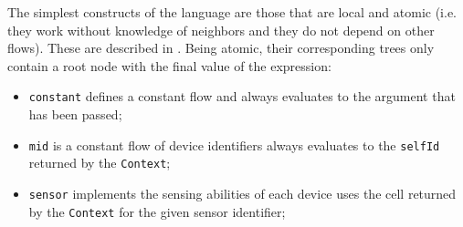 The simplest constructs of the language are those that are local and atomic (i.e. they work without knowledge of neighbors and they do not depend on other flows).
%
These are described in .
%
Being atomic, their corresponding trees only contain a root node with the final value of the expression:
\begin{itemize}
    \item \texttt{constant} defines a constant flow and always evaluates to the argument that has been passed;
    \item \texttt{mid} is a constant flow of device identifiers always evaluates to the \texttt{selfId} returned by the \texttt{Context};
    \item \texttt{sensor} implements the sensing abilities of each device uses the cell returned by the \texttt{Context} for the given sensor identifier;
\end{itemize}
%
